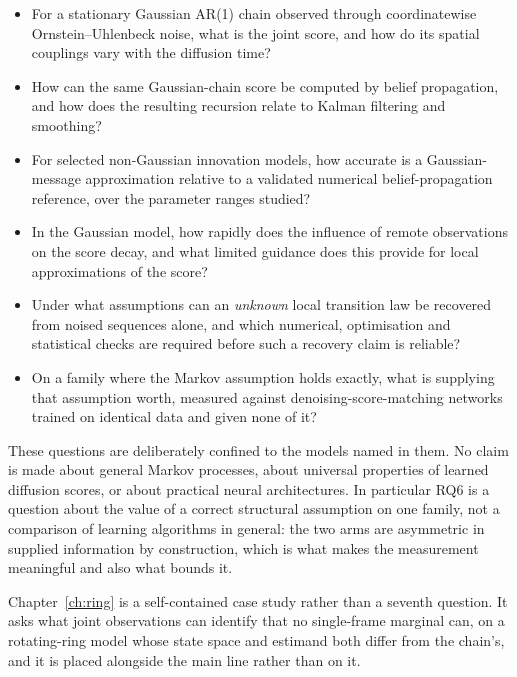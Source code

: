 \begin{itemize}
  \item[\textbf{RQ1.}] For a stationary Gaussian AR(1) chain observed
  through coordinatewise Ornstein--Uhlenbeck noise, what is the joint
  score, and how do its spatial couplings vary with the diffusion time?

  \item[\textbf{RQ2.}] How can the same Gaussian-chain score be computed
  by belief propagation, and how does the resulting recursion relate to
  Kalman filtering and smoothing?

  \item[\textbf{RQ3.}] For selected non-Gaussian innovation models, how
  accurate is a Gaussian-message approximation relative to a validated
  numerical belief-propagation reference, over the parameter ranges
  studied?

  \item[\textbf{RQ4.}] In the Gaussian model, how rapidly does the
  influence of remote observations on the score decay, and what limited
  guidance does this provide for local approximations of the score?

  \item[\textbf{RQ5.}] Under what assumptions can an \emph{unknown} local
  transition law be recovered from noised sequences alone, and which
  numerical, optimisation and statistical checks are required before such
  a recovery claim is reliable?

  \item[\textbf{RQ6.}] On a family where the Markov assumption holds
  exactly, what is supplying that assumption worth, measured against
  denoising-score-matching networks trained on identical data and given
  none of it?
\end{itemize}

These questions are deliberately confined to the models named in them.
No claim is made about general Markov processes, about universal
properties of learned diffusion scores, or about practical neural
architectures. In particular RQ6 is a question about the value of a
correct structural assumption on one family, not a comparison of learning
algorithms in general: the two arms are asymmetric in supplied
information by construction, which is what makes the measurement
meaningful and also what bounds it.

Chapter~\ref{ch:ring} is a self-contained case study rather than a
seventh question. It asks what joint observations can identify that no
single-frame marginal can, on a rotating-ring model whose state space and
estimand both differ from the chain's, and it is placed alongside the
main line rather than on it.


